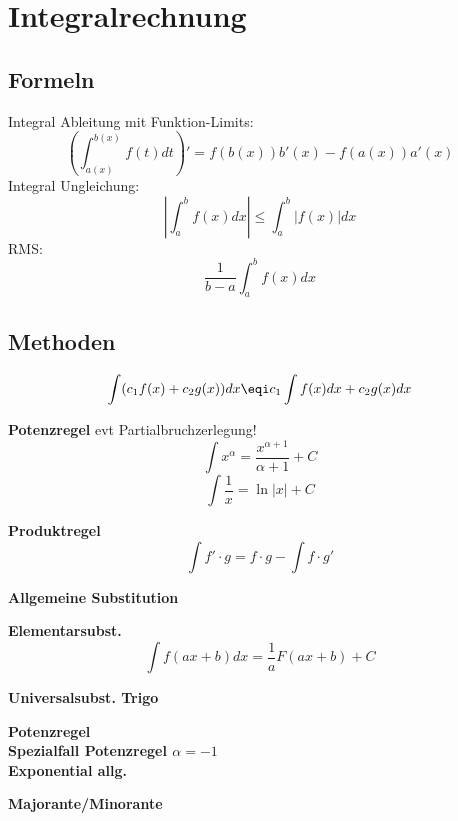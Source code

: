 \section{Integralrechnung}

\subsection{Formeln}
\noindent Integral Ableitung mit Funktion-Limits: \[\left(\int_{a(x)}^{b(x)}f(t)dt\right)' = f(b(x))b'(x) - f(a(x))a'(x)\]
\noindent Integral Ungleichung:
\[\left|\int_{a}^{b}f(x)dx\right| \leq \int_{a}^{b}\left|f(x)\right|dx\]
\noindent RMS: 
\[\frac{1}{b-a}\int_{a}^{b}f(x)dx\]



\subsection{Methoden}
\[
\int(c_1f(x) + c_2g(x))dx \eqi c_1 \int f(x)dx + c_2 g(x) dx
\]

\textbf{Potenzregel} evt Partialbruchzerlegung!
\[
\int x^\alpha = \frac{x^{\alpha  + 1}}{\alpha + 1} + C
\]
\[
\int \frac{1}{x} = \ln\left|x\right| + C
\]

\textbf{Produktregel}
\[
\int f' \cdot g = f \cdot g - \int f \cdot g'
\]

\textbf{Allgemeine Substitution}

\textbf{Elementarsubst.}
\[
\int f(ax + b)dx = \frac{1}{a}F(ax+b)+C
\]

\textbf{Universalsubst. Trigo}\\


\textbf{Potenzregel}\\
\textbf{Spezialfall Potenzregel $\alpha = -1$}\\
\textbf{Exponential allg.}\\

\textbf{Majorante/Minorante}
